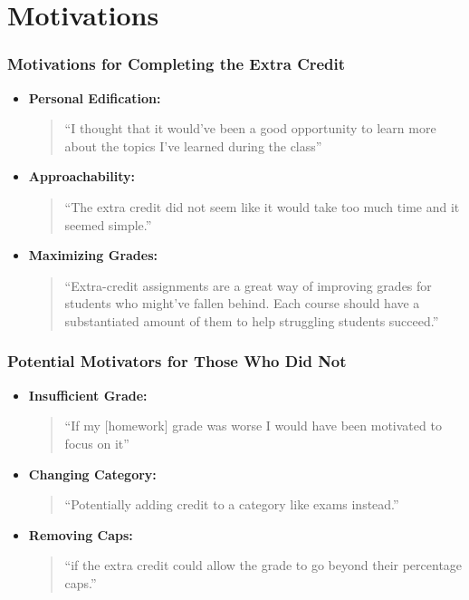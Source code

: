\documentclass{beamer}
\begin{document}
\section{Motivations}


\begin{frame}[fragile]
    \frametitle{Motivations for Completing the Extra Credit}

    \begin{itemize}
      \item \textbf{Personal Edification:}\\
        \begin{quote}
          ``I thought that it would've been a good opportunity to learn more about
          the topics I've learned during the class''
        \end{quote}
      \item \textbf{Approachability:}\\
        \begin{quote}
          ``The extra credit did not seem like it would take too much time and it seemed simple.''
        \end{quote}
      \item \textbf{Maximizing Grades:}\\
        \begin{quote}
          ``Extra-credit assignments are a great way of improving grades for
          students who might've fallen behind. Each course should have a
          substantiated amount of them to help struggling students succeed.''
        \end{quote}
    \end{itemize}

\end{frame}

\begin{frame}
    \frametitle{Potential Motivators for Those Who Did Not}

    \begin{itemize}
      \item \textbf{Insufficient Grade:}\\
        \begin{quote}
          ``If my [homework] grade was worse I would have been motivated to focus on it''
        \end{quote}
      \item \textbf{Changing Category:}\\
        \begin{quote}
          ``Potentially adding credit to a category like exams instead.''
        \end{quote}
      \item \textbf{Removing Caps:}\\
        \begin{quote}
          ``if the extra credit could allow the grade to go beyond their percentage caps.''
        \end{quote}
    \end{itemize}


\end{frame}
\end{document}
